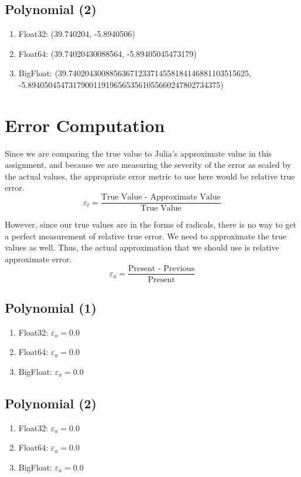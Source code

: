 \documentclass[12pt]{article}
\begin{document}
    \subsection*{Polynomial (2)}
        \begin{enumerate}
            \item Float32: (39.740204, -5.8940506)
            \item Float64: (39.74020430088564, -5.89405045473179)
            \item BigFloat: (39.74020430088563671233714558184146881103515625, \\ -5.89405045473179001191965653561055660247802734375)
        \end{enumerate}

\section{Error Computation}
    Since we are comparing the true value to Julia's approximate value in this assignment, and because we are measuring the severity of the error as scaled by the actual values, the 
    appropriate error metric to use here would be relative true error. 
    \[\varepsilon_t = \frac{\text{True Value - Approximate Value}}{\text{True Value}}\]
    
    However, since our true values are in the forms of radicals, there is no way to get a perfect measurement of relative true error. We need to approximate 
    the true values as well. Thus, the actual approximation that we should use is relative approximate error.
    \[\varepsilon_a = \frac{\text{Present - Previous}}{\text{Present}}\]

    \subsection*{Polynomial (1)}
        \begin{enumerate}
            \item Float32: $\varepsilon_a = 0.0$
            \item Float64: $\varepsilon_a = 0.0$
            \item BigFloat: $\varepsilon_a = 0.0$
        \end{enumerate}

    \subsection*{Polynomial (2)}
        \begin{enumerate}
            \item Float32: $\varepsilon_a = 0.0$
            \item Float64: $\varepsilon_a = 0.0$
            \item BigFloat: $\varepsilon_a = 0.0$
        \end{enumerate}
\end{document}
